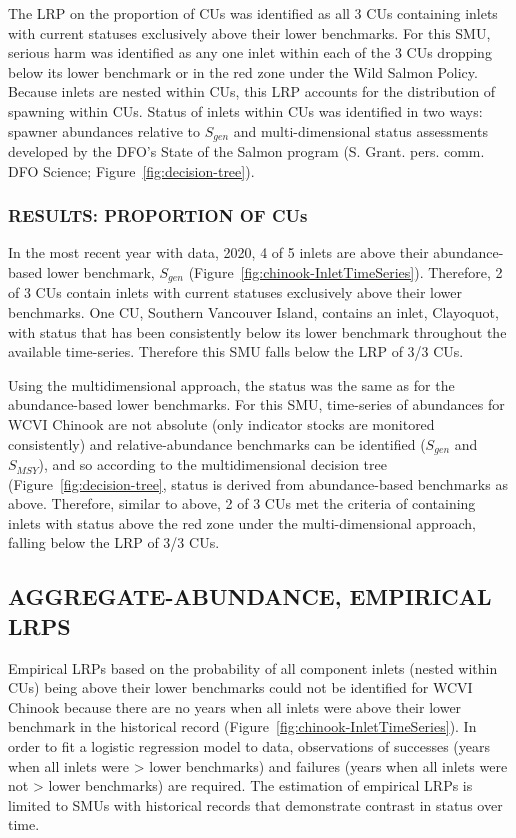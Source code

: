 \documentclass[11pt]{book}
\begin{document}
The LRP on the proportion of CUs was identified as all 3 CUs containing inlets with current statuses exclusively above their lower benchmarks. For this SMU, serious harm was identified as any one inlet within each of the 3 CUs dropping below its lower benchmark or in the red zone under the Wild Salmon Policy. Because inlets are nested within CUs, this LRP accounts for the distribution of spawning within CUs. Status of inlets within CUs was identified in two ways: spawner abundances relative to \(S_{gen}\) and multi-dimensional status assessments developed by the DFO's State of the Salmon program (S. Grant. pers. comm. DFO Science; Figure~\ref{fig:decision-tree}).

\hypertarget{results-proportion-of-cus}{%
\subsubsection{RESULTS: PROPORTION OF CUs}\label{results-proportion-of-cus}}

In the most recent year with data, 2020, 4 of 5 inlets are above their abundance-based lower benchmark, \(S_{gen}\) (Figure~\ref{fig:chinook-InletTimeSeries}). Therefore, 2 of 3 CUs contain inlets with current statuses exclusively above their lower benchmarks. One CU, Southern Vancouver Island, contains an inlet, Clayoquot, with status that has been consistently below its lower benchmark throughout the available time-series. Therefore this SMU falls below the LRP of 3/3 CUs.

Using the multidimensional approach, the status was the same as for the abundance-based lower benchmarks. For this SMU, time-series of abundances for WCVI Chinook are not absolute (only indicator stocks are monitored consistently) and relative-abundance benchmarks can be identified (\(S_{gen}\) and \(S_{MSY}\)), and so according to the multidimensional decision tree (Figure~\ref{fig:decision-tree}, status is derived from abundance-based benchmarks as above. Therefore, similar to above, 2 of 3 CUs met the criteria of containing inlets with status above the red zone under the multi-dimensional approach, falling below the LRP of 3/3 CUs.

\hypertarget{aggregate-abundance-empirical-lrps}{%
\subsection{AGGREGATE-ABUNDANCE, EMPIRICAL LRPS}\label{aggregate-abundance-empirical-lrps}}

Empirical LRPs based on the probability of all component inlets (nested within CUs) being above their lower benchmarks could not be identified for WCVI Chinook because there are no years when all inlets were above their lower benchmark in the historical record (Figure~\ref{fig:chinook-InletTimeSeries}). In order to fit a logistic regression model to data, observations of successes (years when all inlets were \textgreater{} lower benchmarks) and failures (years when all inlets were not \textgreater{} lower benchmarks) are required. The estimation of empirical LRPs is limited to SMUs with historical records that demonstrate contrast in status over time.
\end{document}
